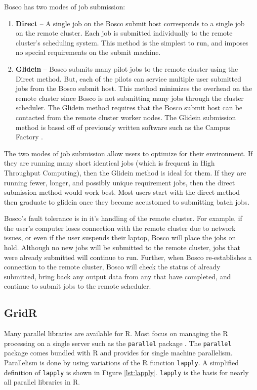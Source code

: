 \documentclass[conference]{IEEEtran}
\begin{document}
Bosco has two modes of job submission:
\begin{enumerate}
\item \textbf{Direct} -- A single job on the Bosco submit host corresponds to a single job on the remote cluster.  Each job is submitted individually to the remote cluster's scheduling system.  This method is the simplest to run, and imposes no special requirements on the submit machine.
\item \textbf{Glidein} -- Bosco submits many pilot jobs to the remote cluster using the Direct method.  But, each of the pilots can service multiple user submitted jobs from the Bosco submit host.  This method minimizes the overhead on the remote cluster since Bosco is not submitting many jobs through the cluster scheduler.  The Glidein method requires that the Bosco submit host can be contacted from the remote cluster worker nodes. \label{sec:glidein}  The Glidein submission method is based off of previously written software such as the Campus Factory \cite{weitzel2011campus}.
\end{enumerate}

The two modes of job submission allow users to optimize for their environment.  If they are running many short identical jobs (which is frequent in High Throughput Computing), then the Glidein method is ideal for them.  If they are running fewer, longer, and possibly unique requirement jobs, then the direct submission method would work best.  Most users start with the direct method then graduate to glidein once they become accustomed to submitting batch jobs.

Bosco's fault tolerance is in it's handling of the remote cluster.  For example, if the user's computer loses connection with the remote cluster due to network issues, or even if the user suspends their laptop, Bosco will place the jobs on hold.  Although no new jobs will be submitted to the remote cluster, jobs that were already submitted will continue to run.  Further, when Bosco re-establishes a connection to the remote cluster, Bosco will check the status of already submitted, bring back any output data from any that have completed, and continue to submit jobs to the remote scheduler.

\subsection{GridR}
Many parallel libraries are available for R.  Most focus on managing the R processing on a single server such as the \texttt{parallel} package \cite{rparallelpackage}.  The \texttt{parallel} package comes bundled with R and provides for single machine parallelism.  Parallelism is done by using variations of the R function \texttt{lapply}.  A simplified definition of \texttt{lapply} is shown in Figure \ref{lst:lapply}.  \texttt{lapply} is the basis for nearly all parallel libraries in R.  
\end{document}
